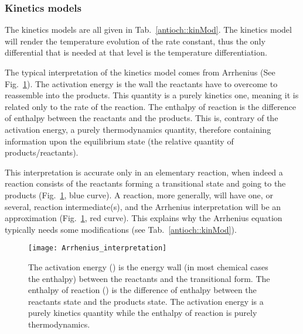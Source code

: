 \subsubsection{Kinetics models}
The kinetics models are all given in Tab.~\ref{antioch::kinMod}.
The kinetics model will render the temperature evolution of
the rate constant, thus the only differential that is needed
at that level is the temperature differentiation.

The typical interpretation of the kinetics model comes from
Arrhenius (See Fig.~\ref{Arrhenius_interp}). The activation
energy is the wall the reactants have to overcome to reassemble
into the products. This quantity is a purely kinetics one, meaning
it is related only to the rate of the reaction. The enthalpy of reaction
is the difference of enthalpy between the reactants and the products.
This is, contrary of the activation energy, a purely thermodynamics
quantity, therefore containing information upon the equilibrium
state (the relative quantity of products/reactants).

This interpretation is accurate only in an elementary reaction, when
indeed a reaction consists of the reactants forming a transitional
state and going to the products (Fig.~\ref{Arrhenius_interp}, blue curve).
A reaction, more generally, will have one, or several, reaction intermediate(s), 
and the Arrhenius interpretation will be an approximation (Fig.~\ref{Arrhenius_interp},
red curve). This explains
why the Arrhenius equation typically needs some modifications (see Tab.~\ref{antioch::kinMod}).

\begin{figure}
\centering
\texttt{[image: Arrhenius\_interpretation]}
\caption{\label{Arrhenius_interp}The activation energy (\AcEn) is the energy wall 
(in most chemical cases the enthalpy) between the reactants and the
transitional form. The enthalpy of reaction (\Denth[r]) is the difference
of enthalpy between the reactants state and the products state. The activation
energy is a purely kinetics quantity while the enthalpy of reaction is purely
thermodynamics.}
\end{figure}

